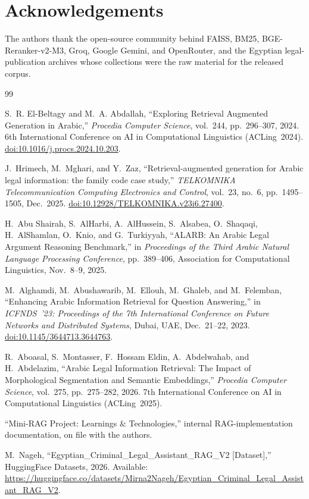 \documentclass[final,1p,times]{elsarticle}
\begin{document}
\section*{Acknowledgements}

The authors thank the open-source community behind FAISS, BM25,
BGE-Reranker-v2-M3, Groq, Google Gemini, and OpenRouter, and the Egyptian
legal-publication archives whose collections were the raw material for the
released corpus.

\begin{thebibliography}{99}

S.~R. El-Beltagy and M.~A. Abdallah,
``Exploring Retrieval Augmented Generation in Arabic,''
\emph{Procedia Computer Science}, vol.~244, pp.~296--307, 2024.
6th International Conference on AI in Computational Linguistics (ACLing~2024).
\href{https://doi.org/10.1016/j.procs.2024.10.203}{doi:10.1016/j.procs.2024.10.203}.

J.~Hrimech, M.~Mghari, and Y.~Zaz,
``Retrieval-augmented generation for Arabic legal information: the family code case study,''
\emph{TELKOMNIKA Telecommunication Computing Electronics and Control},
vol.~23, no.~6, pp.~1495--1505, Dec.~2025.
\href{https://doi.org/10.12928/TELKOMNIKA.v23i6.27400}{doi:10.12928/TELKOMNIKA.v23i6.27400}.

H.~Abu Shairah, S.~AlHarbi, A.~AlHussein, S.~Alsabea, O.~Shaqaqi,
H.~AlShamlan, O.~Knio, and G.~Turkiyyah,
``ALARB: An Arabic Legal Argument Reasoning Benchmark,''
in \emph{Proceedings of the Third Arabic Natural Language Processing Conference},
pp.~389--406, Association for Computational Linguistics, Nov.~8--9, 2025.

M.~Alghamdi, M.~Abushawarib, M.~Ellouh, M.~Ghaleb, and M.~Felemban,
``Enhancing Arabic Information Retrieval for Question Answering,''
in \emph{ICFNDS~'23: Proceedings of the 7th International Conference on
Future Networks and Distributed Systems}, Dubai, UAE, Dec.~21--22, 2023.
\href{https://doi.org/10.1145/3644713.3644763}{doi:10.1145/3644713.3644763}.

R.~Aboasal, S.~Montasser, F.~Hossam Eldin, A.~Abdelwahab, and H.~Abdelazim,
``Arabic Legal Information Retrieval: The Impact of Morphological
Segmentation and Semantic Embeddings,''
\emph{Procedia Computer Science}, vol.~275, pp.~275--282, 2026.
7th International Conference on AI in Computational Linguistics (ACLing~2025).

``Mini-RAG Project: Learnings \& Technologies,''
internal RAG-implementation documentation, on file with the authors.

M.~Nageh,
``Egyptian\_Criminal\_Legal\_Assistant\_RAG\_V2 [Dataset],''
HuggingFace Datasets, 2026.
Available: \url{https://huggingface.co/datasets/Mirna2Nageh/Egyptian_Criminal_Legal_Assistant_RAG_V2}.

\end{thebibliography}
\end{document}
